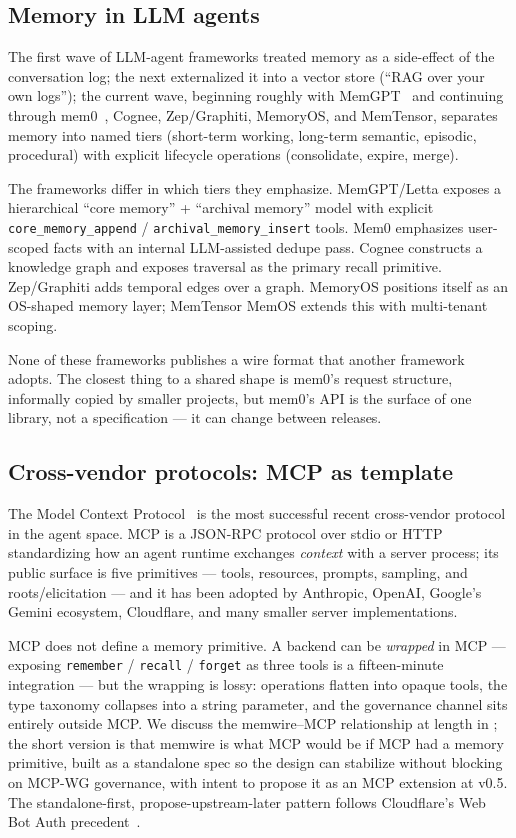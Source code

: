\documentclass[11pt,letterpaper,twocolumn]{article}
\begin{document}
\subsection{Memory in LLM agents}

The first wave of LLM-agent frameworks treated memory as a side-effect of the conversation log; the next externalized it into a vector store (``RAG over your own logs''); the current wave, beginning roughly with MemGPT~\cite{packer2023memgpt} and continuing through mem0~\cite{chhikara2025mem0}, Cognee, Zep/Graphiti, MemoryOS, and MemTensor, separates memory into named tiers (short-term working, long-term semantic, episodic, procedural) with explicit lifecycle operations (consolidate, expire, merge).

The frameworks differ in which tiers they emphasize. MemGPT/Letta exposes a hierarchical ``core memory'' + ``archival memory'' model with explicit \texttt{core\_memory\_append} / \texttt{archival\_memory\_insert} tools. Mem0 emphasizes user-scoped facts with an internal LLM-assisted dedupe pass. Cognee constructs a knowledge graph and exposes traversal as the primary recall primitive. Zep/Graphiti adds temporal edges over a graph. MemoryOS positions itself as an OS-shaped memory layer; MemTensor MemOS extends this with multi-tenant scoping.

None of these frameworks publishes a wire format that another framework adopts. The closest thing to a shared shape is mem0's request structure, informally copied by smaller projects, but mem0's API is the surface of one library, not a specification --- it can change between releases.

\subsection{Cross-vendor protocols: MCP as template}

The Model Context Protocol~\cite{mcp_spec_2025} is the most successful recent cross-vendor protocol in the agent space. MCP is a JSON-RPC protocol over stdio or HTTP standardizing how an agent runtime exchanges \emph{context} with a server process; its public surface is five primitives --- tools, resources, prompts, sampling, and roots/elicitation --- and it has been adopted by Anthropic, OpenAI, Google's Gemini ecosystem, Cloudflare, and many smaller server implementations.

MCP does not define a memory primitive. A backend can be \emph{wrapped} in MCP --- exposing \texttt{remember} / \texttt{recall} / \texttt{forget} as three tools is a fifteen-minute integration --- but the wrapping is lossy: operations flatten into opaque tools, the type taxonomy collapses into a string parameter, and the governance channel sits entirely outside MCP. We discuss the memwire--MCP relationship at length in ; the short version is that memwire is what MCP would be if MCP had a memory primitive, built as a standalone spec so the design can stabilize without blocking on MCP-WG governance, with intent to propose it as an MCP extension at v0.5. The standalone-first, propose-upstream-later pattern follows Cloudflare's Web Bot Auth precedent~\cite{meunier2026webbotauth}.
\end{document}
